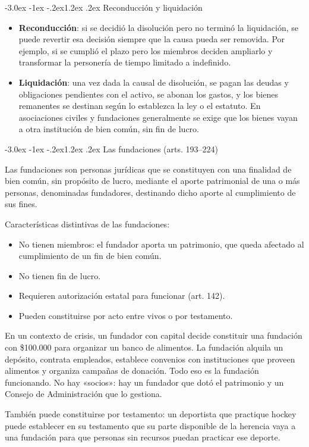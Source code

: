 \documentclass[12pt,oneside]{book}
\makeatletter
\renewcommand\section{\@startsection{section}{1}{\z@}%
  {-3.0ex \@plus -1ex \@minus -.2ex}{1.2ex \@plus .2ex}%
  {\normalfont\large\bfseries\color{acento}}}
\makeatother
\begin{document}
\section{Reconducción y liquidación}

\begin{itemize}
    \item \textbf{Reconducción}: si se decidió la disolución pero no terminó la liquidación, se puede revertir esa decisión siempre que la causa pueda ser removida. Por ejemplo, si se cumplió el plazo pero los miembros deciden ampliarlo y transformar la personería de tiempo limitado a indefinido.
    \item \textbf{Liquidación}: una vez dada la causal de disolución, se pagan las deudas y obligaciones pendientes con el activo, se abonan los gastos, y los bienes remanentes se destinan según lo establezca la ley o el estatuto. En asociaciones civiles y fundaciones generalmente se exige que los bienes vayan a otra institución de bien común, sin fin de lucro.
\end{itemize}

\section{Las fundaciones (arts. 193--224)}

\begin{definicion}
Las fundaciones son personas jurídicas que se constituyen con una finalidad de bien común, sin propósito de lucro, mediante el aporte patrimonial de una o más personas, denominadas fundadores, destinando dicho aporte al cumplimiento de sus fines.
\end{definicion}

Características distintivas de las fundaciones:

\begin{itemize}
    \item No tienen miembros: el fundador aporta un patrimonio, que queda afectado al cumplimiento de un fin de bien común.
    \item No tienen fin de lucro.
    \item Requieren autorización estatal para funcionar (art. 142).
    \item Pueden constituirse por acto entre vivos o por testamento.
\end{itemize}

\begin{ejemplo}
En un contexto de crisis, un fundador con capital decide constituir una fundación con \$100.000 para organizar un banco de alimentos. La fundación alquila un depósito, contrata empleados, establece convenios con instituciones que proveen alimentos y organiza campañas de donación. Todo eso es la fundación funcionando. No hay «socios»: hay un fundador que dotó el patrimonio y un Consejo de Administración que lo gestiona.

También puede constituirse por testamento: un deportista que practique hockey puede establecer en su testamento que su parte disponible de la herencia vaya a una fundación para que personas sin recursos puedan practicar ese deporte.
\end{ejemplo}
\end{document}
